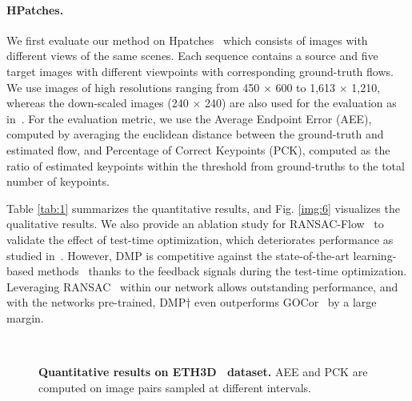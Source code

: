 \documentclass[10pt,twocolumn,letterpaper]{article}
\newcommand{\figref}[1]{Fig. \ref{#1}}
\newcommand{\tabref}[1]{Table \ref{#1}}
\begin{document}
\paragraph{HPatches.}
We first evaluate our method on Hpatches~\cite{balntas2017hpatches} which consists of images with different views of the same scenes. Each sequence contains a source and five target images with different viewpoints with corresponding ground-truth flows. We use images of high resolutions ranging from 450 $\times$ 600 to 1,613 $\times$ 1,210, whereas the down-scaled images (240 $\times$ 240) are also used for the evaluation as in~\cite{melekhov2019dgc}. For the evaluation metric, we use the Average Endpoint Error (AEE), computed by averaging the euclidean distance between the ground-truth and estimated flow, and Percentage of Correct Keypoints (PCK), computed as the ratio of estimated keypoints within the threshold from ground-truths to the total number of keypoints.

\tabref{tab:1} summarizes the quantitative results, and \figref{img:6} visualizes the qualitative results. We also provide an ablation study for RANSAC-Flow~\cite{shen2020ransac} to validate the effect of test-time optimization, which deteriorates performance as studied in~\cite{shen2020ransac}. However, DMP is competitive against the state-of-the-art learning-based methods~\cite{melekhov2019dgc,truong2020glu,shen2020ransac} thanks to the feedback signals during the test-time optimization. Leveraging RANSAC~\cite{fischler1981random} within our network allows outstanding performance, and with the networks pre-trained, DMP$\dagger$ even outperforms GOCor~\cite{truong2020gocor} by a large margin. 
\vspace{-10pt}
\begin{figure}
	\centering
	\renewcommand{\thesubfigure}{}
	\hfill
	\hfill\\
    \caption{\textbf{Quantitative results on ETH3D~\cite{schops2017multi} dataset.} AEE and PCK are computed on image pairs sampled at different intervals.}
\label{ETH3d}\vspace{-5pt}\label{img:8}
\end{figure}
\end{document}
